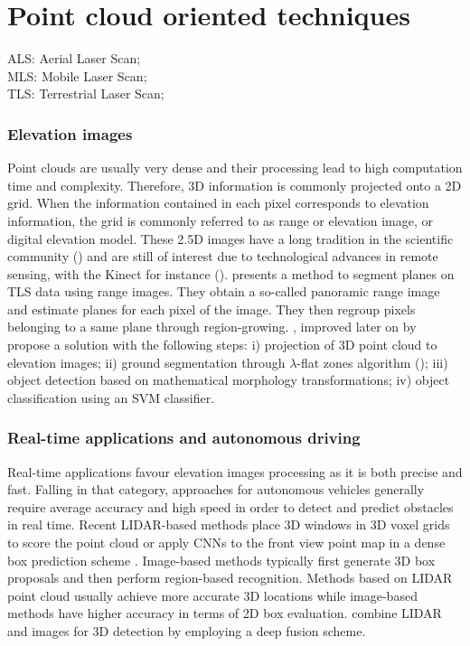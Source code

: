 \documentclass{kththesis}
\begin{document}
\section{Point cloud oriented techniques}
ALS: Aerial Laser Scan; \\
MLS: Mobile Laser Scan; \\
TLS: Terrestrial Laser Scan; 
\subsubsection{Elevation images}
Point clouds are usually very dense and their processing lead to high computation time and complexity. Therefore, 3D information is commonly projected onto a 2D grid. When the information contained in each pixel corresponds to elevation information, the grid is commonly referred to as range or elevation image, or digital elevation model. These 2.5D images have a long tradition in the scientific community (\textcite{Hoover1996}) and are still of interest due to technological advances in remote sensing, with the Kinect for instance (\textcite{SaponaraIriartePaniagua654209}). 
\textcite{Gorte2007PlanarFE}
presents a method to segment planes on TLS data using range images. They obtain a so-called panoramic range image and estimate planes for each pixel of the image. They then regroup pixels belonging to a same plane through region-growing.  \textcite{HernandezArtefacts}, improved later on by \textcite{det_seg_class} propose a solution with the following steps: i) projection of 3D point cloud to elevation images; ii) ground segmentation through $\lambda$-flat zones algorithm (\textcite{morphoMeyer}); iii) object detection based on mathematical morphology transformations; iv) object classification using an SVM classifier.  

\subsubsection{Real-time applications and autonomous driving}
Real-time applications favour elevation images processing as it is both precise and fast. Falling in that category, 
approaches for autonomous vehicles generally  require average accuracy and high speed in order to detect and predict obstacles in real
time. Recent LIDAR-based methods place 3D windows
in 3D voxel grids to score the point cloud \parencite{zengang2015, vote3deep2016} or apply
CNNs to the front view point map in
a dense box prediction scheme \textcite{BoLi2016}. Image-based methods
\parencite{Chen2016, Chen2} typically first generate 3D box proposals and then perform region-based recognition.  Methods based on LIDAR point cloud
usually achieve more accurate 3D locations while image-based
methods have higher accuracy in terms of 2D box
evaluation.  \textcite{autonomous_driving} combine LIDAR and images for 3D
detection by employing a deep fusion scheme.
\end{document}
